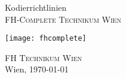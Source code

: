 %
%

\begin{titlepage}
\begin{center}
\vspace*{40mm} \huge Kodierrichtlinien\\
\vspace*{10mm}
\large \textsc{FH-Complete Technikum Wien}

\vfill \texttt{[image: fhcomplete]}
	
\vfill \textsc{FH Technikum Wien}\\

Wien, \today
\end{center}
\end{titlepage}
